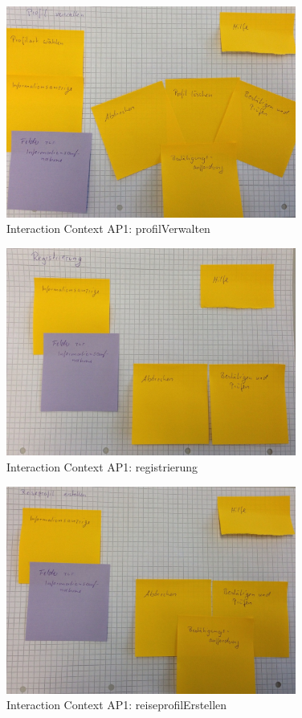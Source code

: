 \begin{figure}[H]
\centering
\includegraphics[width=0.85\textwidth]{./images/abstract/version1/profilVerwalten.JPG}
\caption{Interaction Context AP1: profilVerwalten}
\label{interfaceContents27}
\end{figure}


\begin{figure}[H]
\centering
\includegraphics[width=0.85\textwidth]{./images/abstract/version1/registrierung.JPG}
\caption{Interaction Context AP1: registrierung}
\label{interfaceContents28}
\end{figure}

\begin{figure}[H]
\centering
\includegraphics[width=0.85\textwidth]{./images/abstract/version1/reiseprofilErstellen.JPG}
\caption{Interaction Context AP1: reiseprofilErstellen}
\label{interfaceContents29}
\end{figure}

